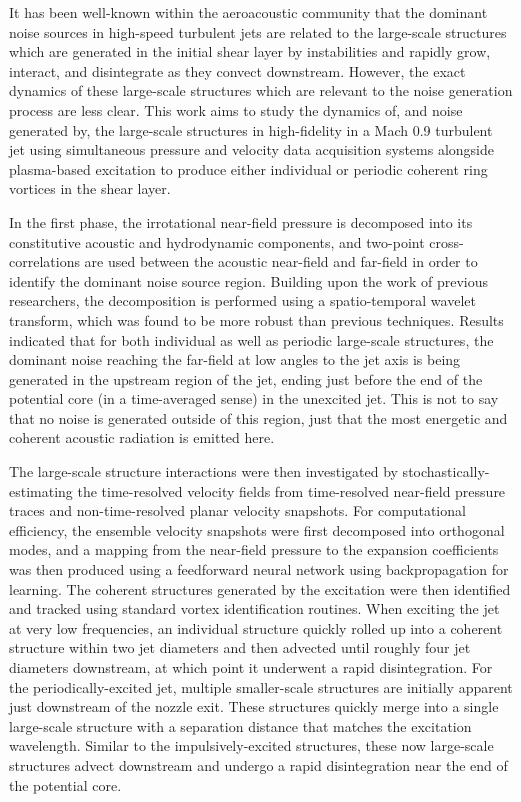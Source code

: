 It has been well-known within the aeroacoustic community that the dominant noise sources in high-speed turbulent jets are related to the large-scale structures which are generated in the initial shear layer by instabilities and rapidly grow, interact, and disintegrate as they convect downstream.
However, the exact dynamics of these large-scale structures which are relevant to the noise generation process are less clear.
This work aims to study the dynamics of, and noise generated by, the large-scale structures in high-fidelity in a Mach 0.9 turbulent jet using simultaneous pressure and velocity data acquisition systems alongside plasma-based excitation to produce either individual or periodic coherent ring vortices in the shear layer.

In the first phase, the irrotational near-field pressure is decomposed into its constitutive acoustic and hydrodynamic components, and two-point cross-correlations are used between the acoustic near-field and far-field in order to identify the dominant noise source region.
Building upon the work of previous researchers, the decomposition is performed using a spatio-temporal wavelet transform, which was found to be more robust than previous techniques.
Results indicated that for both individual as well as periodic large-scale structures, the dominant noise reaching the far-field at low angles to the jet axis is being generated in the upstream region of the jet, ending just before the end of the potential core (in a time-averaged sense) in the unexcited jet.
This is not to say that no noise is generated outside of this region, just that the most energetic and coherent acoustic radiation is emitted here.

The large-scale structure interactions were then investigated by stochastically-estimating the time-resolved velocity fields from time-resolved near-field pressure traces and non-time-resolved planar velocity snapshots.
For computational efficiency, the ensemble velocity snapshots were first decomposed into orthogonal modes, and a mapping from the near-field pressure to the expansion coefficients was then produced using a feedforward neural network using backpropagation for learning.
The coherent structures generated by the excitation were then identified and tracked using standard vortex identification routines.
When exciting the jet at very low frequencies, an individual structure quickly rolled up into a coherent structure within two jet diameters and then advected until roughly four jet diameters downstream, at which point it underwent a rapid disintegration.
For the periodically-excited jet, multiple smaller-scale structures are initially apparent just downstream of the nozzle exit.
These structures quickly merge into a single large-scale structure with a separation distance that matches the excitation wavelength.
Similar to the impulsively-excited structures, these now large-scale structures advect downstream and undergo a rapid disintegration near the end of the potential core. 

